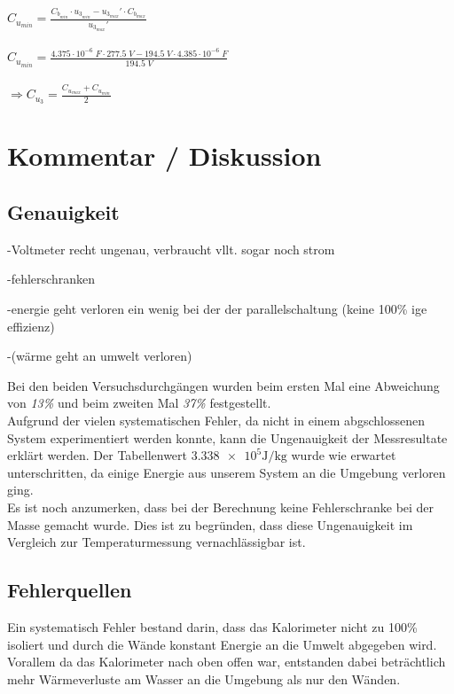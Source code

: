 \documentclass[a4paper,12pt]{article}
\begin{document}
$C_{u_{min}} = \displaystyle{\frac{C_{b_{min}}\cdot u_{3_{min}}-u_{3_{max}}'\cdot C_{b_{max}}}{u_{3_{max}}'}}$\\\\

$C_{u_{min}} = \displaystyle{\frac{4.375\cdot 10^{-6}\;F\cdot 277.5\;V-194.5\;V\cdot 4.385\cdot 10^{-6}\;F}{194.5\;V}}$\\\\

$\Rightarrow C_{u_3}=\displaystyle{\frac{C_{u_{max}}+C_{u_{min}}}{2}}$

\section{Kommentar / Diskussion}

\subsection{Genauigkeit}
-Voltmeter recht ungenau, verbraucht vllt. sogar noch strom

-fehlerschranken

-energie geht verloren ein wenig bei der der parallelschaltung (keine 100\% ige effizienz)

-(wärme geht an umwelt verloren)

Bei den beiden Versuchsdurchgängen wurden beim ersten Mal eine Abweichung von \textit{13\%} und beim zweiten Mal \textit{37\%} festgestellt.\\

Aufgrund der vielen systematischen Fehler, da nicht in einem abgschlossenen System experimentiert werden konnte, kann die Ungenauigkeit der Messresultate erklärt werden. Der Tabellenwert $\num{3.338 e5}\si{\J\per\kg}$ \cite{formelsammlung} wurde wie erwartet unterschritten, da einige Energie aus unserem System an die Umgebung verloren ging.\\

Es ist noch anzumerken, dass bei der Berechnung keine Fehlerschranke bei der Masse gemacht wurde. Dies ist zu begründen, dass diese Ungenauigkeit im Vergleich zur Temperaturmessung vernachlässigbar ist.

\subsection{Fehlerquellen}

Ein systematisch Fehler bestand darin, dass das Kalorimeter nicht zu 100\% isoliert und durch die Wände konstant Energie an die Umwelt abgegeben wird. Vorallem da das Kalorimeter nach oben offen war, entstanden dabei beträchtlich mehr Wärmeverluste am Wasser an die Umgebung als nur den Wänden.\\
\end{document}
